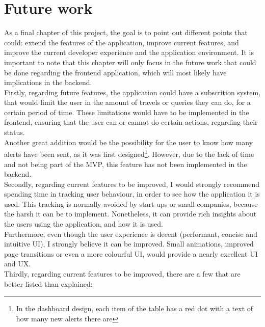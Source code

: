 \documentclass[../memory.tex]{subfiles}
\begin{document}
\chapter{Future work}
As a final chapter of this project, the goal is to point out different points
that could: extend the features of the application, improve current features,
and improve the current developer experience and the application environment. It
is important to note that this chapter will only focus in the future work that
could be done regarding the frontend application, which will most likely have
implications in the backend.
\\[8pt]
Firstly, regarding future features, the application could have a subscrition
system, that would limit the user in the amount of travels or queries they can
do, for a certain period of time. These limitations would have to be
implemented in the frontend, ensuring that the user can or cannot do certain
actions, regarding their status.
\\
Another great addition would be the possibility for the user to know how many
alerts have been sent, as it was first designed\footnote{In the dashboard
	design, each item of the table has a red dot with a text of how many new alerts
	there are}. However, due to the lack of time and not being part of the MVP, this
feature has not been implemented in the backend.
\\[8pt]
Secondly, regarding current features to be improved, I would strongly recommend
spending time in tracking user behaviour, in order to see how the application it
is used. This tracking is normally avoided by start-ups or small companies,
because the harsh it can be to implement. Nonetheless, it can provide rich
insights about the users using the application, and how it is used.
\\
Furthermore, even though the user experience is decent (performant, concise and
intuitive UI), I strongly believe it can be improved. Small animations, improved
page transitions or even a more colourful UI, would provide a nearly excellent
UI and UX.
\\[8pt]
Thirdly, regarding current features to be improved, there are a few that are
better listed than explained:
\end{document}
